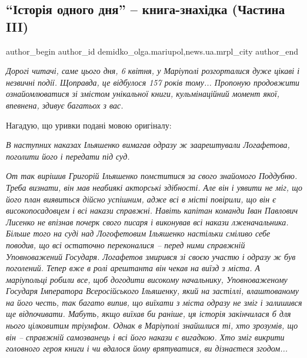  
 
 
 
 
 
\subsection{\enquote{Історія одного дня} – книга-знахідка (Частина III)}
\label{sec:06_04_2020.stz.news.ua.mrpl_city.1.istoria_odnogo_dnja_chastyna_3}
 
\ifcmt
 author_begin
   author_id demidko_olga.mariupol,news.ua.mrpl_city
 author_end
\fi

{\em
Дорогі читачі, саме цього дня, 6 квітня, у Маріуполі розгорталися дуже цікаві і
незвичні події. Щоправда, це відбулося 157 років тому... Пропоную продовжити
ознайомлюватися зі змістом унікальної книги, кульмінаційний момент якої,
впевнена, здивує багатьох з вас.

Нагадую, що уривки подані мовою оригіналу:
}


\emph{В наступних наказах Ільяшенко вимагав одразу ж заарештували Логафетова, поголити його і передати під суд.}


\begingroup
\em От так вирішив Григорій Ільяшенко помститися за свого знайомого Поддубню. Треба
визнати, він мав неабиякі акторські здібності. Але він і уявити не міг, що його
план виявиться дійсно успішним, адже всі в місті повірили, що він є
високопосадовцем і всі накази справжні. Навіть капітан команди Іван Павлович
Лисенко не впізнав почерк свого писаря і виконував всі накази лженачальника.
Більше того на суді над Логофетовим Ільяшенко настільки сміливо себе поводив,
що всі остаточно переконалися – перед ними справжній Уповноважений Государя.
Логафетов змирився зі своєю участю і одразу ж був поголений. Тепер вже в ролі
арештанта він чекав на виїзд з міста. А маріупольці робили все, щоб догодити
високому начальнику, Уповноваженому Государя Імператора Всеросійського
Ільяшенку, який на застіллі, влаштованому на його честь, так багато випив, що
виїхати з міста одразу не зміг і залишився ще відпочивати. Мабуть, якщо виїхав
би раніше, ця історія закінчилася б для нього цілковитим тріумфом. Однак в
Маріуполі знайшлися ті, хто зрозумів, що він – справжній самозванець і всі його
накази є вигадкою. Хто зміг викрити головного героя книги і чи вдалося йому
врятуватися, ви дізнаєтеся згодом... 
\endgroup

